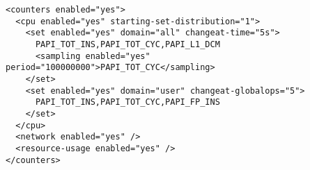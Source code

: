 \begin{verbatim}
<counters enabled="yes">
  <cpu enabled="yes" starting-set-distribution="1">
    <set enabled="yes" domain="all" changeat-time="5s">
      PAPI_TOT_INS,PAPI_TOT_CYC,PAPI_L1_DCM
      <sampling enabled="yes" period="100000000">PAPI_TOT_CYC</sampling>
    </set>
    <set enabled="yes" domain="user" changeat-globalops="5">
      PAPI_TOT_INS,PAPI_TOT_CYC,PAPI_FP_INS
    </set>
  </cpu>
  <network enabled="yes" />
  <resource-usage enabled="yes" />
</counters>
\end{verbatim}
